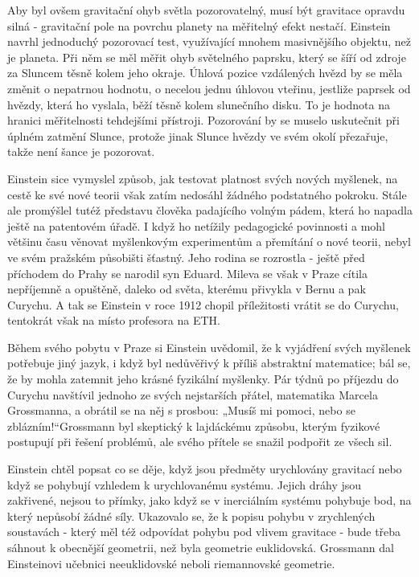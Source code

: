   Aby byl ovšem gravitační ohyb světla pozorovatelný, musí být gravitace opravdu silná - gravitační
  pole na povrchu planety na měřitelný efekt nestačí. Einstein navrhl jednoduchý pozorovací test,
  využívající mnohem masivnějšího objektu, než je planeta. Při něm se měl měřit ohyb světelného
  paprsku, který se šíří od zdroje za Sluncem těsně kolem jeho okraje. Úhlová pozice vzdálených
  hvězd by se měla změnit o nepatrnou hodnotu, o necelou jednu úhlovou vteřinu, jestliže paprsek od
  hvězdy, která ho vyslala, běží těsně kolem slunečního disku. To je hodnota na hranici měřitelnosti
  tehdejšími přístroji. Pozorování by se muselo uskutečnit při úplném zatmění Slunce, protože jinak
  Slunce hvězdy ve svém okolí přezařuje, takže není šance je pozorovat. 
  
  Einstein sice vymyslel způsob, jak testovat platnost svých nových myšlenek, na cestě ke své nové
  teorii však zatím nedosáhl žádného podstatného pokroku. Stále ale promýšlel tutéž představu
  člověka padajícího volným pádem, která ho napadla ještě na patentovém úřadě. I když ho netížily
  pedagogické povinnosti a mohl většinu času věnovat myšlenkovým experimentům a přemítání o nové
  teorii, nebyl ve svém pražském působišti šťastný. Jeho rodina se rozrostla - ještě před příchodem
  do Prahy se narodil syn Eduard. Mileva se však v Praze cítila nepříjemně a opuštěně, daleko od
  světa, kterému přivykla v Bernu a pak Curychu. A tak se Einstein v roce 1912 chopil příležitosti
  vrátit se do Curychu, tentokrát však na místo profesora na ETH. 
  
  Během svého pobytu v Praze si Einstein uvědomil, že k vyjádření svých myšlenek potřebuje jiný
  jazyk, i když byl nedůvěřivý k příliš abstraktní matematice; bál se, že by mohla zatemnit jeho
  krásné fyzikální myšlenky. Pár týdnů po příjezdu do Curychu navštívil jednoho ze svých nejstarších
  přátel, matematika Marcela Grossmanna, a obrátil se na něj s prosbou: „Musíš mi pomoci, nebo se
  zblázním!“Grossmann byl skeptický k lajdáckému způsobu, kterým fyzikové postupují při řešení
  problémů, ale svého přítele se snažil podpořit ze všech sil. 
  
  Einstein chtěl popsat co se děje, když jsou předměty urychlovány gravitací nebo když se pohybují
  vzhledem k urychlovanému systému. Jejich dráhy jsou zakřivené, nejsou to přímky, jako když se v
  inerciálním systému pohybuje bod, na který nepůsobí žádné síly. Ukazovalo se, že k popisu pohybu v
  zrychlených soustavách - který měl též odpovídat pohybu pod vlivem gravitace - bude třeba sáhnout
  k obecnější geometrii, než byla geometrie euklidovská. Grossmann dal Einsteinovi učebnici
  neeuklidovské neboli riemannovské geometrie. 
  
